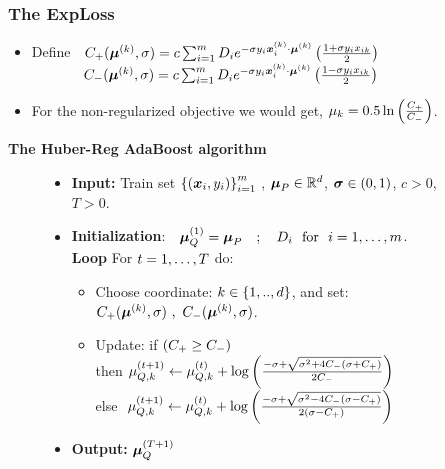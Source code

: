 \documentclass[mathserif]{beamer}
\begin{document}
\begin{frame}
\frametitle{ The ExpLoss  }
\begin{itemize}
\item Define $~~C_+( {\boldsymbol{\mu}}^{(k)},\sigma)=c\sum_{i =1}^m D_i e^{-\sigma y_{i}  {\boldsymbol{x}}_{i}^{(k)} \cdot {\boldsymbol{\mu}}^{(k)}} \left({  \frac{1+\sigma y_{i}  x_{ik}  }{2}}\right)$  \\ $~~~~~~~~~~~C_-( {\boldsymbol{\mu}}^{(k)},\sigma)=c\sum_{i =1}^m D_i e^{-\sigma y_{i}  {\boldsymbol{x}}_{i}^{(k)} \cdot {\boldsymbol{\mu}}^{(k)}} \left({  \frac{1-\sigma y_{i}  x_{ik}  }{2}}\right)$
 \item For the non-regularized objective we would get,
 $\mu_k=0.5\ln{\left({\frac{C_+}{C_-}}\right)}$.
 \end{itemize}
\vspace{-0.18cm}
\begin{exampleblock}{\textbf{The Huber-Reg AdaBoost algorithm} }
\begin{figure}[!h!]
\begin{itemize}
\item {\bf Input:} Train set $\left\{{({\boldsymbol{x}}_{i},y_{i})}\right\}_{i=1}^m$ ,
  ${\boldsymbol{\mu}}_P\in \mathbb{R}^d$, ${\boldsymbol{\sigma}}\in(0,1)$, $c>0$, $T>0$.
\item{\bf Initialization}:$\quad{\boldsymbol{\mu}}_Q^{(1)} ={\boldsymbol{\mu}}_P \quad; \quad D_{i} ~~ \textrm {for     }~ i = 1 , \ldots , m$.\\
{\bf Loop} For $t = 1 , \ldots , T$ do:
\nolineskips
\begin{itemize}
\item Choose coordinate: $k\in \left\{{1,..,d}\right\}$,
and set: $C_+( {\boldsymbol{\mu}}^{(k)},\sigma)~,~ C_-( {\boldsymbol{\mu}}^{(k)},\sigma)$.
\item Update:
  if $\left({C_+\geq C_-}\right)$
 \\then $\mu_{Q,k}^{(t+1)}\leftarrow \mu_{Q,k}^{(t)}+  \log{\left({ \frac{-\sigma+\sqrt{\sigma^2+4C_-(\sigma+C_+)}}{2C_-}}\right)}$
 \\else $~\mu_{Q,k}^{(t+1)}\leftarrow \mu_{Q,k}^{(t)}+\log{\left({ \frac{-\sigma+\sqrt{\sigma^2-4C_-(\sigma-C_+)}}{2(\sigma-C_+)}}\right)}$
\end{itemize}
\item {\bf Output:} ${\boldsymbol{\mu}}_Q^{(T+1)}$
\vspace{-0.12cm}
\end{itemize}
\end{figure}
 \end{exampleblock}
\end{frame}
\end{document}
